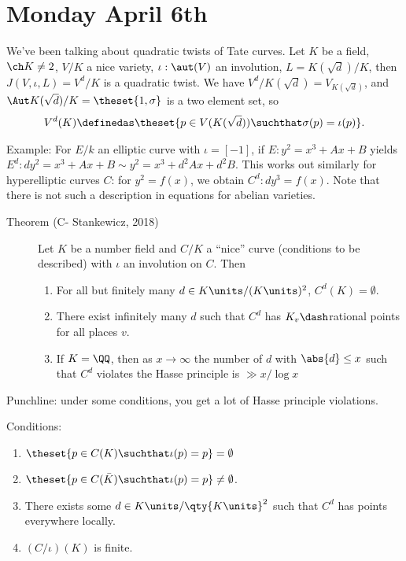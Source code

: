 \hypertarget{monday-april-6th}{%
\section{Monday April 6th}\label{monday-april-6th}}

We've been talking about quadratic twists of Tate curves. Let \(K\) be a
field, \(\ch K \neq 2\), \(V/K\) a nice variety, \(\iota: \aut(V)\) an
involution, \(L = K(\sqrt d)/K\), then \(J(V, \iota, L) = V^d/K\) is a
quadratic twist. We have \(V^d / K(\sqrt d) = V_{K(\sqrt d)}\), and
\(\Aut K(\sqrt d) / K = \theset{1, \sigma}\) is a two element set, so
\begin{align*}
V^d(K) \definedas \theset{ p \in V(K(\sqrt d)) \suchthat \sigma(p) = \iota(p) }
.\end{align*}

Example: For \(E/k\) an elliptic curve with \(\iota = [-1]\), if
\(E: y^2 =x^3 + Ax + B\) yields
\(E^d: dy^2 = x^3 + Ax + B \sim y^2 = x^3 + d^2Ax + d^2 B\). This works
out similarly for hyperelliptic curves \(C\): for \(y^2 = f(x)\), we
obtain \(C^d: dy^3 = f(x)\). Note that there is not such a description
in equations for abelian varieties.

\begin{description}
\item[Theorem (C- Stankewicz, 2018)]
Let \(K\) be a number field and \(C/K\) a ``nice'' curve (conditions to
be described) with \(\iota\) an involution on \(C\). Then

\begin{enumerate}
\def\labelenumi{\alph{enumi}.}
\tightlist
\item
  For all but finitely many \(d \in K\units / (K\units)^2\),
  \(C^d(K) = \emptyset\).
\item
  There exist infinitely many \(d\) such that \(C^d\) has
  \(K_v\dash\)rational points for all places \(v\).
\item
  If \(K = \QQ\), then as \(x\to\infty\) the number of \(d\) with
  \(\abs{d} \leq x\) such that \(C^d\) violates the Hasse principle is
  \(\gg x/\log x\)
\end{enumerate}
\end{description}

Punchline: under some conditions, you get a lot of Hasse principle
violations.

Conditions:

\begin{enumerate}
\def\labelenumi{\arabic{enumi}.}
\tightlist
\item
  \(\theset{p\in C(K) \suchthat \iota(p) = p} = \emptyset\)
\item
  \(\theset{p \in C(\bar K) \suchthat \iota(p) = p} \neq \emptyset\).
\item
  There exists some \(d\in K\units / \qty{K\units}^2\) such that \(C^d\)
  has points everywhere locally.
\item
  \((C/\iota)(K)\) is finite.
\end{enumerate}

